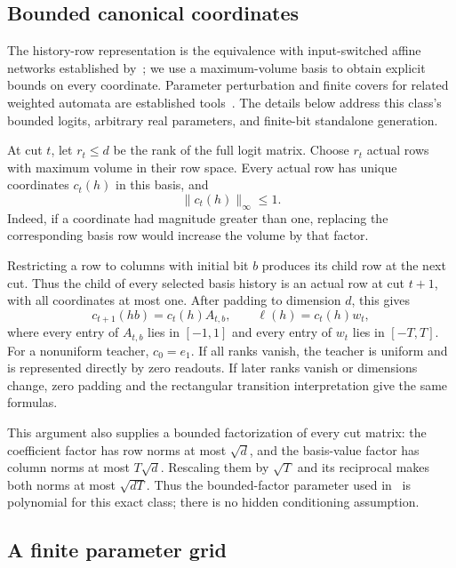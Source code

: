 \documentclass[11pt]{article}
\theoremstyle{definition}
\theoremstyle{remark}
\begin{document}
\subsection{Bounded canonical coordinates}

The history-row representation is the equivalence with input-switched affine networks established by~\citet{gls1}; we use a maximum-volume basis to obtain explicit bounds on every coordinate. Parameter perturbation and finite covers for related weighted automata are established tools~\cite{balle-mohri}. The details below address this class's bounded logits, arbitrary real parameters, and finite-bit standalone generation.

At cut $t$, let $r_t\le d$ be the rank of the full logit matrix. Choose $r_t$ actual rows with maximum volume in their row space. Every actual row has unique coordinates $c_t(h)$ in this basis, and
\begin{equation}\label{eq:canonical}
\|c_t(h)\|_\infty\le1.
\end{equation}
Indeed, if a coordinate had magnitude greater than one, replacing the corresponding basis row would increase the volume by that factor.

Restricting a row to columns with initial bit $b$ produces its child row at the next cut. Thus the child of every selected basis history is an actual row at cut $t+1$, with all coordinates at most one. After padding to dimension $d$, this gives
\[
c_{t+1}(hb)=c_t(h)A_{t,b},\qquad
\ell(h)=c_t(h)w_t,
\]
where every entry of $A_{t,b}$ lies in $[-1,1]$ and every entry of $w_t$ lies in $[-T,T]$. For a nonuniform teacher, $c_0=e_1$. If all ranks vanish, the teacher is uniform and is represented directly by zero readouts. If later ranks vanish or dimensions change, zero padding and the rectangular transition interpretation give the same formulas.

This argument also supplies a bounded factorization of every cut matrix: the coefficient factor has row norms at most $\sqrt d$, and the basis-value factor has column norms at most $T\sqrt d$. Rescaling them by $\sqrt T$ and its reciprocal makes both norms at most $\sqrt{dT}$. Thus the bounded-factor parameter used in~\cite{gls2} is polynomial for this exact class; there is no hidden conditioning assumption.

\subsection{A finite parameter grid}
\end{document}
